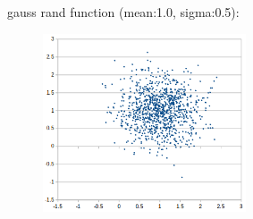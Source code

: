 gauss rand function (mean:1.0, sigma:0.5):\\
\begin{center}
\begin{figure}[H]
\centering\includegraphics[width=6cm]{./gaussrnd.png}\\
\end{figure}
\end{center}

